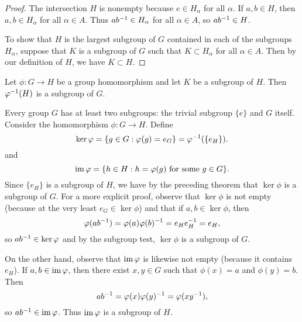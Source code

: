 \begin{proof}
    The intersection \(H\) is nonempty because \(e \in H_\alpha\) for all
    \(\alpha\). If \(a, b \in H\), then \(a, b \in H_\alpha\) for all \(\alpha
    \in A\). Thus \(ab^{-1} \in H_\alpha\) for all \(\alpha \in A\), so \(ab^{-1}
    \in H\).

    To show that \(H\) is the largest subgroup of \(G\) contained in each of the
    subgroups \(H_{\alpha}\), suppose that \(K\) is a subgroup of \(G\) such
    that \(K \subset H_{\alpha}\) for all \(\alpha \in A\). Then by our
    definition of \(H\), we have \(K \subset H\).
\end{proof}

\begin{theorem}
    Let \(\phi: G \to H\) be a group homomorphism and let \(K\) be a subgroup of
    \(H\). Then \(\varphi^{-1}(H)\) is a subgroup of \(G\).
\end{theorem}


Every group \(G\) has at least two subgroups: the trivial subgroup \(\{e\}\) and
\(G\) itself. Consider the homomorphism \(\phi: G \to H\). Define
\[
    \ker \varphi = \{g \in G : \varphi(g) = e_G\} = \varphi^{-1}(\{e_H\}).
\]
and
\[
    \operatorname{im} \varphi = \{h \in H : h = \varphi(g) \text{ for some } g \in G\}.
\]
Since \(\{e_H\}\) is a subgroup of \(H\), we have by the preceding theorem that
\(\ker \phi\) is a subgroup of \(G\). For a more explicit proof, observe that
\(\ker \phi\) is not empty (because at the very least \(e_G \in \ker \phi\)) and
that if \(a, b \in \ker \phi\), then 
\[
    \varphi(ab^{-1}) = \varphi(a)\varphi(b)^{-1} = e_H e_H^{-1} = e_H,
\]
so \(ab^{-1} \in \ker \varphi\) and by the subgroup test, \(\ker \phi\) is a
subgroup of \(G\).

On the other hand, observe that \(\operatorname{im} \varphi\) is likewise not empty (because it
contains \(e_H\)). If \(a, b \in \operatorname{im} \varphi\), then there exist \(x, y \in G\)
such that \(\phi(x) = a\) and \(\phi(y) = b\). Then
\[
    ab^{-1} = \varphi(x)\varphi(y)^{-1} = \varphi(xy^{-1}),
\]
so \(ab^{-1} \in \operatorname{im} \varphi\). Thus \(\operatorname{im} \varphi\) is a subgroup of \(H\).

